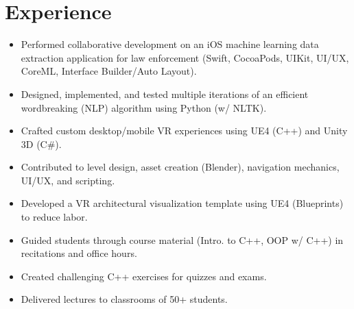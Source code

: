 \documentclass[]{deedy_resume}
\begin{document}
\hfill
\begin{minipage}[t]{0.63\textwidth} 


\section{Experience}
\begin{itemize}[noitemsep,topsep=0pt]
\item Performed collaborative development on an iOS machine learning data extraction application for law enforcement (Swift, CocoaPods, UIKit, UI/UX, CoreML, Interface Builder/Auto Layout).
\item Designed, implemented, and tested multiple iterations of an efficient wordbreaking (NLP) algorithm using Python (w/ NLTK).
\end{itemize}
\vspace{3mm}

\begin{itemize}[noitemsep,topsep=0pt]
\item Crafted custom desktop/mobile VR experiences using UE4 (C++) and Unity 3D (C\#).
\item Contributed to level design, asset creation (Blender), navigation mechanics, UI/UX, and scripting.
\item Developed a VR architectural visualization template using UE4 (Blueprints) to reduce labor.
\end{itemize}
\vspace{3mm}

\begin{itemize}[noitemsep,topsep=0pt]
\itemsep0em 
\item Guided students through course material (Intro. to C++, OOP w/ C++) in recitations and office hours.
\item Created challenging C++ exercises for quizzes and exams.
\item Delivered lectures to classrooms of 50+ students.
\end{itemize}
\sectionsep


\end{minipage}
\end{document}
